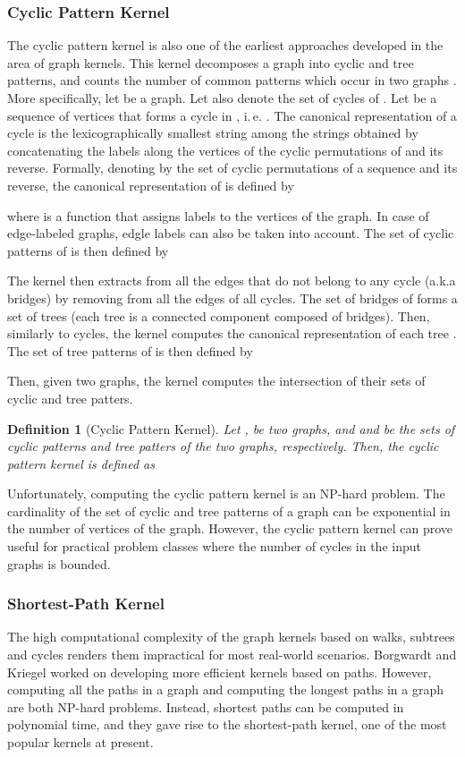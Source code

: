 \documentclass[twoside,11pt]{article}
\newcommand{\ie}{i.\,e. }
\newtheorem{definition}{Definition}
\begin{document}
\subsubsection{Cyclic Pattern Kernel}
The cyclic pattern kernel is also one of the earliest approaches developed in the area of graph kernels.
This kernel decomposes a graph into cyclic and tree patterns, and counts the number of common patterns which occur in two graphs \cite{horvath2004cyclic}.
More specifically, let  be a graph.
Let also  denote the set of cycles of .
Let  be a sequence of vertices that forms a cycle in , \ie .
The canonical representation of a cycle  is the lexicographically smallest string  among the strings obtained by concatenating the labels along the vertices of the cyclic permutations of  and its reverse.
Formally, denoting by  the set of cyclic permutations of a sequence  and its reverse, the canonical representation of  is defined by

where  is a function that assigns labels to the vertices of the graph.
In case of edge-labeled graphs, edgle labels can also be taken into account.
The set of cyclic patterns of  is then defined by


The kernel then extracts from  all the edges that do not belong to any cycle (a.k.a bridges) by removing from  all the edges of all cycles.
The set of bridges of  forms a set of trees (each tree is a connected component composed of bridges).
Then, similarly to cycles, the kernel computes the canonical representation  of each tree .
The set of tree patterns of  is then defined by

Then, given two graphs, the kernel computes the intersection of their sets of cyclic and tree patters.
\begin{definition}[Cyclic Pattern Kernel]
  Let ,  be two graphs, and  and  be the sets of cyclic patterns and tree patters of the two graphs, respectively.
  Then, the cyclic pattern kernel is defined as
  
\end{definition}
Unfortunately, computing the cyclic pattern kernel is an NP-hard problem.
The cardinality of the set of cyclic and tree patterns of a graph can be exponential in the number of vertices of the graph. 
However, the cyclic pattern kernel can prove useful for practical problem classes where the number of cycles in the input graphs is bounded.

\subsubsection{Shortest-Path Kernel}
The high computational complexity of the graph kernels based on walks, subtrees and cycles renders them impractical for most real-world scenarios.
Borgwardt and Kriegel \citeyear{borgwardt2005shortest} worked on developing more efficient kernels based on paths.
However, computing all the paths in a graph and computing the longest paths in a graph are both NP-hard problems.
Instead, shortest paths can be computed in polynomial time, and they gave rise to the shortest-path kernel, one of the most popular kernels at present.
\end{document}
